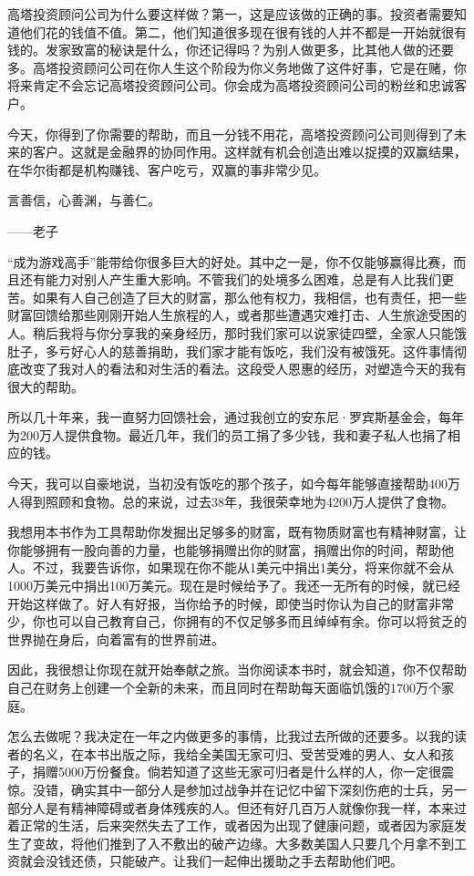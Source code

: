 高塔投资顾问公司为什么要这样做？第一，这是应该做的正确的事。投资者需要知道他们花的钱值不值。第二，他们知道很多现在很有钱的人并不都是一开始就很有钱的。发家致富的秘诀是什么，你还记得吗？为别人做更多，比其他人做的还要多。高塔投资顾问公司在你人生这个阶段为你义务地做了这件好事，它是在赌，你将来肯定不会忘记高塔投资顾问公司。你会成为高塔投资顾问公司的粉丝和忠诚客户。

今天，你得到了你需要的帮助，而且一分钱不用花，高塔投资顾问公司则得到了未来的客户。这就是金融界的协同作用。这样就有机会创造出难以捉摸的双赢结果，在华尔街都是机构赚钱、客户吃亏，双赢的事非常少见。

\begin{BookQuote}
言善信，心善渊，与善仁。

\hfill ——老子
\end{BookQuote}

“成为游戏高手”能带给你很多巨大的好处。其中之一是，你不仅能够赢得比赛，而且还有能力对别人产生重大影响。不管我们的处境多么困难，总是有人比我们更苦。如果有人自己创造了巨大的财富，那么他有权力，我相信，也有责任，把一些财富回馈给那些刚刚开始人生旅程的人，或者那些遭遇灾难打击、人生旅途受困的人。稍后我将与你分享我的亲身经历，那时我们家可以说家徒四壁，全家人只能饿肚子，多亏好心人的慈善捐助，我们家才能有饭吃，我们没有被饿死。这件事情彻底改变了我对人的看法和对生活的看法。这段受人恩惠的经历，对塑造今天的我有很大的帮助。

所以几十年来，我一直努力回馈社会，通过我创立的安东尼·罗宾斯基金会，每年为200万人提供食物。最近几年，我们的员工捐了多少钱，我和妻子私人也捐了相应的钱。

今天，我可以自豪地说，当初没有饭吃的那个孩子，如今每年能够直接帮助400万人得到照顾和食物。总的来说，过去38年，我很荣幸地为4200万人提供了食物。

我想用本书作为工具帮助你发掘出足够多的财富，既有物质财富也有精神财富，让你能够拥有一股向善的力量，也能够捐赠出你的财富，捐赠出你的时间，帮助他人。不过，我要告诉你，如果现在你不能从1美元中捐出1美分，将来你就不会从1000万美元中捐出100万美元。现在是时候给予了。我还一无所有的时候，就已经开始这样做了。好人有好报，当你给予的时候，即使当时你认为自己的财富非常少，你也可以自己教育自己，你拥有的不仅足够多而且绰绰有余。你可以将贫乏的世界抛在身后，向着富有的世界前进。

因此，我很想让你现在就开始奉献之旅。当你阅读本书时，就会知道，你不仅帮助自己在财务上创建一个全新的未来，而且同时在帮助每天面临饥饿的1700万个家庭。

怎么去做呢？我决定在一年之内做更多的事情，比我过去所做的还要多。以我的读者的名义，在本书出版之际，我给全美国无家可归、受苦受难的男人、女人和孩子，捐赠5000万份餐食。倘若知道了这些无家可归者是什么样的人，你一定很震惊。没错，确实其中一部分人是参加过战争并在记忆中留下深刻伤疤的士兵，另一部分人是有精神障碍或者身体残疾的人。但还有好几百万人就像你我一样，本来过着正常的生活，后来突然失去了工作，或者因为出现了健康问题，或者因为家庭发生了变故，将他们推到了入不敷出的破产边缘。大多数美国人只要几个月拿不到工资就会没钱还债，只能破产。让我们一起伸出援助之手去帮助他们吧。

